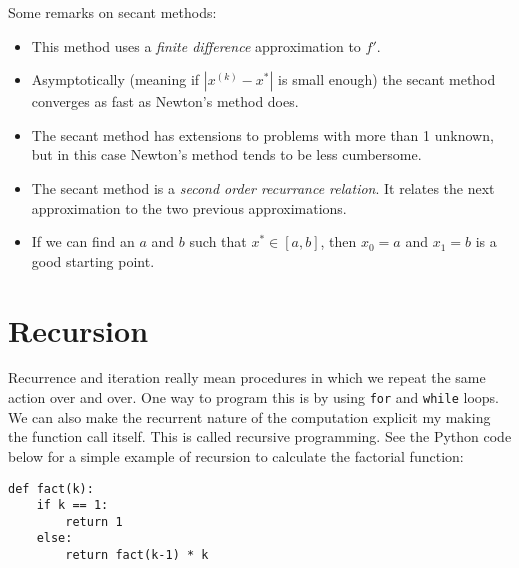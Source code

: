 \documentclass{article}
\newenvironment{remark}
	{\definecolor{shadethmcolor}{HTML}{DFD4FF}\definecolor{shaderulecolor}{HTML}{713DFF}\setlength{\shadeboxrule}{.4pt}\begin{protoremark}\normalfont}
	{\end{protoremark}}
\begin{document}
\begin{remark}
Some remarks on secant methods:
\begin{itemize}
	\item This method uses a \textit{finite difference} approximation to $f'$. 
	\item Asymptotically (meaning if $|x^{(k)}-x^*|$ is small enough) the secant method converges as fast as Newton's method does. 
	\item The secant method has extensions to problems with more than 1 unknown, but in this case Newton's method tends to be less cumbersome.
	\item The secant method is a \textit{second order recurrance relation}. It relates the next approximation to the two previous approximations. 
	\item If we can find an $a$ and $b$ such that $x^* \in [a,b]$, then $x_0=a$ and $x_1=b$ is a good starting point.
\end{itemize}
\end{remark}
\section*{Recursion}
Recurrence and iteration really mean procedures in which we repeat the same action over and over. One way to program this is by using \texttt{for} and \texttt{while} loops. We can also make the recurrent nature of the computation explicit my making the function call itself. This is called recursive programming. See the Python code below for a simple example of recursion to calculate the factorial function:

\begin{verbatim}
def fact(k):
	if k == 1:
		return 1
	else:
		return fact(k-1) * k
\end{verbatim}
\end{document}
